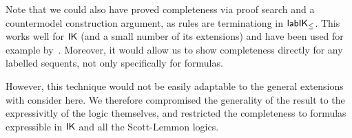 Note that we could also have proved completeness via proof search and a countermodel construction argument, as rules are terminationg in $\mathsf{lab}\mathsf{IK}_{\le}$. 
%
This works well for $\mathsf{IK}$ (and a small number of its extensions) and have been used for example by~\cite{maffezioli:etal:synthese13}. 
%
Moreover, it would allow us to show completeness directly for any labelled sequents, not only specifically for formulas. 

However, this technique would not be easily adaptable to the general extensions with consider here. 
%
We therefore compromised the generality of the result to the expressivitly of the logic themselves, and restricted the completeness to formulas expressible in $\mathsf{IK}$ and all the Scott-Lemmon logics.



%
%
%
